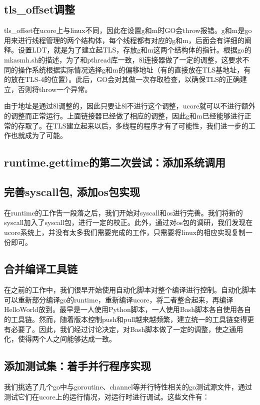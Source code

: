 \documentclass{article}
\begin{document}
\subsection{tls\_offset调整}
tls\_offset在ucore上与linux不同，因此在设置g和m时GO会throw报错。g和m是go用来进行线程管理的两个结构体，每个线程都有对应的g和m，后面会有详细的阐释。设置LDT，就是为了建立起TLS，存放g和m这两个结构体的指针。根据go的mkasmh.sh的描述，为了和pthread库一致，8l连接器做了一定的调整，这要求不同的操作系统根据实际情况选择g和m的偏移地址（有的直接放在TLS基地址，有的放在TLS-4的位置）。此后，GO会对其做一次存取检查，以确保TLS的正确建立，否则将throw一个异常。

由于地址是通过8l调整的，因此只要让8l不进行这个调整，ucore就可以不进行额外的调整而正常运行。上面链接器已经做了相应的调整，因此g和m已经能够进行正常的存取了。在TLS建立起来以后，多线程的程序才有了可能性，我们进一步的工作也就成为了可能。

\subsection{runtime.gettime的第二次尝试：添加系统调用}

\subsection{完善syscall包, 添加os包实现}
在runtime的工作告一段落之后，我们开始对syscall和os进行完善。我们将新的syscall加入了syscall包，进行一定的校正。此外，通过对os包的调研，我们发现在ucore系统上，并没有太多我们需要完成的工作，只需要将linux的相应实现复制一份即可。

\subsection{合并编译工具链}
在之前的工作中，我们很早开始使用自动化脚本对整个编译进行控制。自动化脚本可以重新部分编译go的runtime，重新编译ucore，将二者整合起来，再编译HelloWorld放到。最早是一人使用Python脚本，一人使用Bash脚本各自使用各自的工具链。然而，随着版本控制push和pull越来越频繁，建立统一的工具链变得更有必要了。因此，我们经过讨论决定，对Bash脚本做了一定的调整，使之通用化，使得两个人之间能够达成一致。

\subsection{添加测试集：着手并行程序实现}
我们挑选了几个go中与goroutine、channel等并行特性相关的go测试源文件，通过测试它们在ucore上的运行情况，对运行时进行调试。这些文件有：
\end{document}
